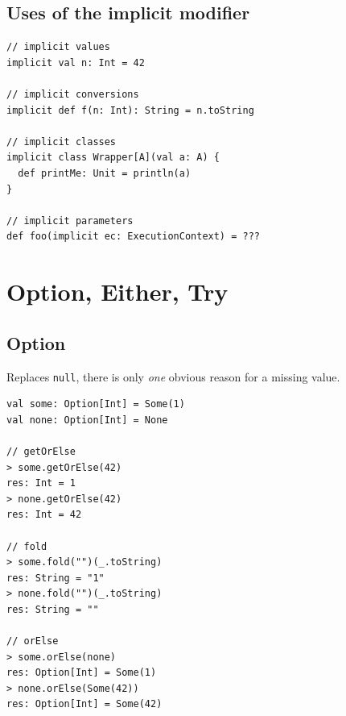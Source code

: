 \documentclass[10pt,landscape,a4paper]{article}
\begin{document}
\begin{multicols*}{4}
  \subsection{Uses of the implicit modifier}

\begin{verbatim}
// implicit values
implicit val n: Int = 42

// implicit conversions
implicit def f(n: Int): String = n.toString

// implicit classes
implicit class Wrapper[A](val a: A) {
  def printMe: Unit = println(a)
}

// implicit parameters
def foo(implicit ec: ExecutionContext) = ???
\end{verbatim}

  \newpage{}

  \section{Option, Either, Try}

  \subsection{Option}
  \begin{mdframed}
    Replaces \texttt{null}, there is only \textit{one} obvious
    reason for a missing value.
  \end{mdframed}
  \begin{center}
  \end{center}
\begin{verbatim}
val some: Option[Int] = Some(1)
val none: Option[Int] = None

// getOrElse
> some.getOrElse(42)
res: Int = 1
> none.getOrElse(42)
res: Int = 42

// fold
> some.fold("")(_.toString)
res: String = "1"
> none.fold("")(_.toString)
res: String = ""

// orElse
> some.orElse(none)
res: Option[Int] = Some(1)
> none.orElse(Some(42))
res: Option[Int] = Some(42)


\end{verbatim}
\end{multicols*}
\end{document}
